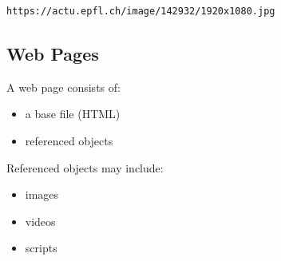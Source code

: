 \begin{verbatim}
https://actu.epfl.ch/image/142932/1920x1080.jpg
\end{verbatim}

\subsection{Web Pages}

A web page consists of:

\begin{itemize}
\item a base file (HTML)
\item referenced objects
\end{itemize}

Referenced objects may include:

\begin{itemize}
\item images
\item videos
\item scripts
\end{itemize}


